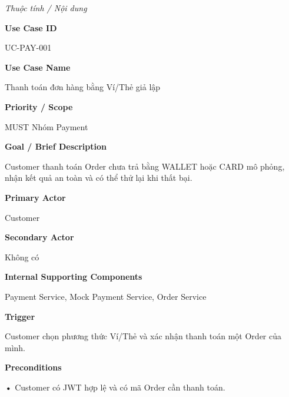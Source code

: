 \documentclass[11pt,a4paper,oneside]{report}
\begin{document}
\par\noindent\textit{Thuộc tính / Nội dung}\par

\par\smallskip\noindent\textcolor{sgublue}{\textbf{Use Case ID}}\par\nobreak
UC-PAY-001
\par

\par\smallskip\noindent\textcolor{sgublue}{\textbf{Use Case Name}}\par\nobreak
Thanh toán đơn hàng bằng Ví/Thẻ giả lập
\par

\par\smallskip\noindent\textcolor{sgublue}{\textbf{Priority / Scope}}\par\nobreak
MUST \textbar{} Nhóm Payment
\par

\par\smallskip\noindent\textcolor{sgublue}{\textbf{Goal / Brief Description}}\par\nobreak
Customer thanh toán Order chưa trả bằng WALLET hoặc CARD mô phỏng, nhận kết quả an toàn và có thể thử lại khi thất bại.
\par

\par\smallskip\noindent\textcolor{sgublue}{\textbf{Primary Actor}}\par\nobreak
Customer
\par

\par\smallskip\noindent\textcolor{sgublue}{\textbf{Secondary Actor}}\par\nobreak
Không có
\par

\par\smallskip\noindent\textcolor{sgublue}{\textbf{Internal Supporting Components}}\par\nobreak
Payment Service, Mock Payment Service, Order Service
\par

\par\smallskip\noindent\textcolor{sgublue}{\textbf{Trigger}}\par\nobreak
Customer chọn phương thức Ví/Thẻ và xác nhận thanh toán một Order của mình.
\par

\par\smallskip\noindent\textcolor{sgublue}{\textbf{Preconditions}}\par\nobreak
\textbf{•} Customer có JWT hợp lệ và có mã Order cần thanh toán.
\end{document}
